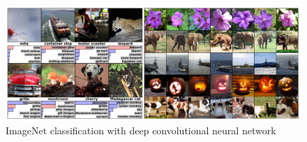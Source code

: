 \newpage

  \begin{figure}[h]
    \centering
    \includegraphics[keepaspectratio, scale=0.30] {images/deep_convolutional_neural_networks.png}
    \caption{ImageNet classification with deep convolutional neural network \cite{alex}}
    \label{Fig:deep_convolutional_neural_networks}
  \end{figure}


\newpage
